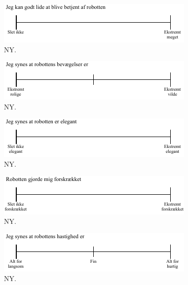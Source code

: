 %
\begin{figure}[H]
\centering
\includegraphics[width =\textwidth]{Figure/UdvalgteSkalaer/BetjeningAfR} 
\caption{NY.}
\label{fig:SkalaBetjeningAfR}
\end{figure}
\noindent
%

%
\begin{figure}[H]
\centering
\includegraphics[width =\textwidth]{Figure/UdvalgteSkalaer/BevaegelserR} 
\caption{NY.}
\label{fig:SkalaBevaegelserR}
\end{figure}
\noindent
%

%
\begin{figure}[H]
\centering
\includegraphics[width =\textwidth]{Figure/UdvalgteSkalaer/ElegantR} 
\caption{NY.}
\label{fig:SkalaElegantR}
\end{figure}
\noindent
%

%
\begin{figure}[H]
\centering
\includegraphics[width =\textwidth]{Figure/UdvalgteSkalaer/Forskraekket} 
\caption{NY.}
\label{fig:SkalaForskraekket}
\end{figure}
\noindent
%

%
\begin{figure}[H]
\centering
\includegraphics[width =\textwidth]{Figure/UdvalgteSkalaer/HastighedR} 
\caption{NY.}
\label{fig:SkalaHastighedR}
\end{figure}
\noindent
%

